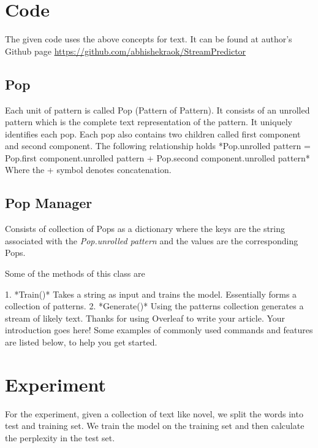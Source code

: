\documentclass[fleqn,10pt]{olplainarticle}
\begin{document}
\section*{Code}
The given code uses the above concepts for text. 
It can be found at author's Github page \url{https://github.com/abhishekraok/StreamPredictor} 

\subsection{Pop}
Each unit of pattern is called Pop (Pattern of Pattern). It consists of an unrolled pattern which is the complete text representation of the pattern. It uniquely identifies each pop. Each pop also contains two children called first component and second component. 
The following relationship holds 
*Pop.unrolled pattern = Pop.first component.unrolled pattern + Pop.second component.unrolled pattern*
Where the + symbol denotes concatenation. 

\subsection{Pop Manager}
Consists of collection of Pops as a dictionary where the keys are the string associated with the \textit{Pop.unrolled pattern} and the values are the corresponding Pops.

Some of the methods of this class are 

1. *Train()* Takes a string as input and trains the model. Essentially forms a collection of patterns.
2. *Generate()* Using the patterns collection generates a stream of likely text. 
Thanks for using Overleaf to write your article. Your introduction goes here! Some examples of commonly used commands and features are listed below, to help you get started.

\section*{Experiment}
For the experiment, given a collection of text like novel, we split the words into test and training set. We train the model on the training set and then calculate the perplexity in the test set.














\end{document}
